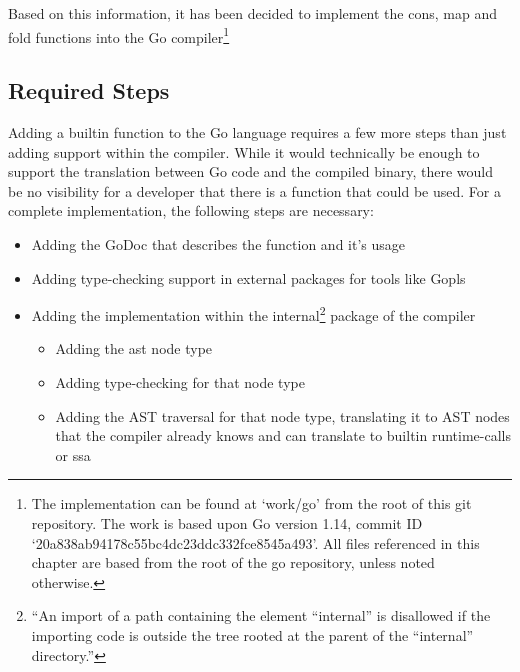 Based on this information, it has been decided to implement the cons, map and fold functions into the
Go compiler\footnote{The implementation can be found at `work/go' from the root of this git repository\cite{git-repo}. The work
is based upon Go version 1.14, commit ID `20a838ab94178c55bc4dc23ddc332fce8545a493'.
All files referenced in this chapter are based from the root of the go repository, unless noted otherwise.}

\subsection{Required Steps}

Adding a builtin function to the Go language requires a few more steps than just adding support
within the compiler. While it would technically be enough to support the translation between
Go code and the compiled binary, there would be no visibility for a developer that there is a
function that could be used.
For a complete implementation, the following steps are necessary:
\begin{itemize}
    \item Adding the GoDoc\cite{godoc} that describes the function and it's usage
    \item Adding type-checking support in external packages for tools like Gopls\cite{gopls}
    \item Adding the implementation within the internal\footnote{
            ``An import of
            a path containing the element “internal” is disallowed if the importing code is
            outside the tree rooted at the parent of the “internal” directory.''\cite{internal-packages}
        }
        package of the compiler
        \begin{itemize}
            \item Adding the \gls{ast} node type
            \item Adding type-checking for that node type
            \item Adding the AST traversal for that node type, translating it
                to AST nodes that the compiler already knows and can translate
                to builtin runtime-calls or \gls{ssa}
        \end{itemize}
\end{itemize}

